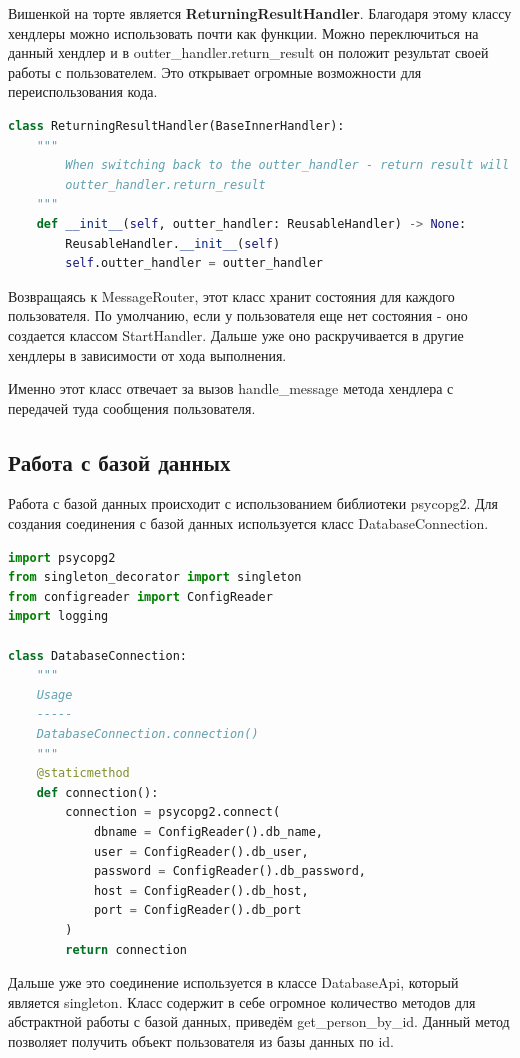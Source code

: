 \documentclass[12pt]{extarticle}
\begin{document}
Вишенкой на торте является \textbf{ReturningResultHandler}. Благодаря этому классу хендлеры можно использовать почти как функции. Можно переключиться на данный хендлер и в outter\_handler.return\_result он положит результат своей работы с пользователем. Это открывает огромные возможности для переиспользования кода.

\begin{lstlisting}[language=Python,style=mystyle,caption=class ReturningResultHandler]
class ReturningResultHandler(BaseInnerHandler):
    """
        When switching back to the outter_handler - return result will be in
        outter_handler.return_result
    """
    def __init__(self, outter_handler: ReusableHandler) -> None:
        ReusableHandler.__init__(self)
        self.outter_handler = outter_handler
\end{lstlisting}

Возвращаясь к MessageRouter, этот класс хранит состояния для каждого пользователя. По умолчанию, если у пользователя еще нет состояния - оно создается классом StartHandler. Дальше уже оно раскручивается в другие хендлеры в зависимости от хода выполнения.

Именно этот класс отвечает за вызов handle\_message метода хендлера с передачей туда сообщения пользователя.

\subsection{Работа с базой данных}

Работа с базой данных происходит с использованием библиотеки psycopg2. Для создания соединения с базой данных используется класс DatabaseConnection.

\begin{lstlisting}[language=Python,style=mystyle,caption=class ReturningResultHandler]
import psycopg2
from singleton_decorator import singleton
from configreader import ConfigReader
import logging

class DatabaseConnection:
    """
    Usage
    -----
    DatabaseConnection.connection()
    """
    @staticmethod
    def connection():
        connection = psycopg2.connect(
            dbname = ConfigReader().db_name,
            user = ConfigReader().db_user,
            password = ConfigReader().db_password,
            host = ConfigReader().db_host,
            port = ConfigReader().db_port
        )
        return connection
\end{lstlisting}

Дальше уже это соединение используется в классе DatabaseApi, который является singleton. Класс содержит в себе огромное количество методов для абстрактной работы с базой данных, приведём get\_person\_by\_id. Данный метод позволяет получить объект пользователя из базы данных по id.
\end{document}
